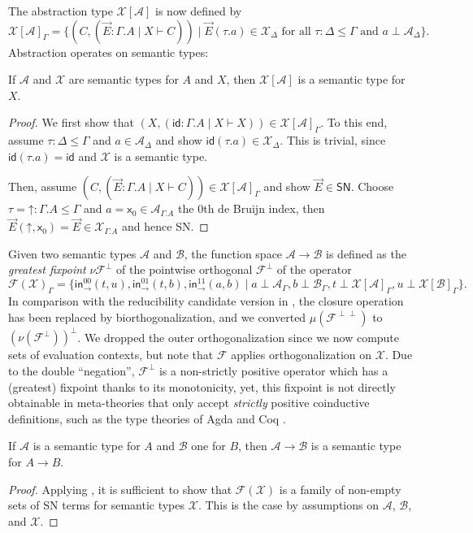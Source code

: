 \documentclass[a4paper,USenglish,cleveref, autoref, thm-restate]{lipics-v2021}
\newcommand{\tid}{\mathsf{id}}
\newcommand{\x}{\mathsf{x}}
\newcommand{\tin}{\ensuremath{\mathsf{in}}}
\newcommand{\inn}[2]{\ensuremath{\tin_{#1}^{#2}}}
\newcommand{\A}{\mathcal{A}}
\newcommand{\B}{\mathcal{B}}
\newcommand{\F}{\mathcal{F}}
\newcommand{\X}{\mathcal{X}}
\newcommand{\SN}{\mathsf{SN}}
\newcommand{\up}{\mathord{\uparrow}}
\begin{document}
The abstraction type $\X[\A]$ is now defined by
\[
  \X[\A]_\Gamma =
  \{ (C, (\vec E : \Gamma.A \mid X \vdash C))
     \mid \vec E (\tau.a) \in \X_\Delta
     \mbox{ for all } \tau : \Delta \leq \Gamma
     \mbox{ and } a \perp \A_\Delta
  \}
  .
\]
Abstraction operates on semantic types:
\begin{lemma}
  \label{lem:absrev}
  If $\A$ and $\X$ are semantic types for $A$ and $X$, then $\X[\A]$
  is a semantic type for $X$.
\end{lemma}
\begin{proof}
  We first show that
  $(X, (\tid : \Gamma.A \mid X \vdash X)) \in \X[\A]_\Gamma$.
  To this end, assume $\tau : \Delta \leq \Gamma$ and $a \in
  \A_\Delta$ and show $\tid(\tau.a) \in \X_\Delta$.  This is trivial,
  since $\tid(\tau.a) = \tid$ and $\X$ is a semantic type.

  Then, assume $(C, (\vec E : \Gamma.A \mid X \vdash C)) \in
  \X[\A]_\Gamma$ and show $\vec E \in \SN$.
  Choose $\tau = \up : \Gamma.A \leq \Gamma$ and $a = \x_0 \in
  \A_{\Gamma.A}$ the 0th de Bruijn index, then $\vec E (\up,\x_0) =
  \vec E \in \X_{\Gamma.A}$ and hence SN.
\end{proof}
Given two semantic types $\A$ and $\B$, the function space $\A \to \B$
is defined as the \emph{greatest fixpoint} $\nu \F^\perp$ of the
pointwise orthogonal $\F^\perp$ of the operator
\[
  \F(\X)_\Gamma =
  \{
    \inn\to{00}(t,u),
    \inn\to{01}(t,b),
    \inn\to{11}(a,b) \mid
      a \perp \A_\Gamma,
      b \perp \B_\Gamma,
      t \perp \X[\A]_\Gamma,
      u \perp \X[\B]_\Gamma
  \}
  .
\]
In comparison with the reducibility candidate version in
, the closure operation has been replaced by
biorthogonalization, and we converted $\mu(\F^{\perp\perp})$
to $(\nu(\F^\perp))^\perp$.  We dropped the outer orthogonalization since
we now compute sets of evaluation contexts, but note that $\F$ applies
orthogonalization on $\X$.
Due to the double ``negation'', $\F^\perp$ is a non-strictly positive
operator which has a (greatest) fixpoint thanks to its monotonicity,
yet, this fixpoint is not directly obtainable in meta-theories that
only accept \emph{strictly} positive coinductive definitions, such as
the type theories of Agda \cite{agda:261} and Coq \cite{coq:8120}.

\begin{lemma}
  \label{lem:funrev}
  If $\A$ is a semantic type for $A$ and $\B$ one for $B$, then $\A
  \to \B$ is a semantic type for $A \to B$.
\end{lemma}
\begin{proof}
  Applying ,
  it is sufficient to show that $\F(\X)$ is a family of non-empty sets
  of SN terms for semantic types $\X$.
  This is the case by assumptions on $\A$, $\B$, and $\X$.
\end{proof}
\end{document}
